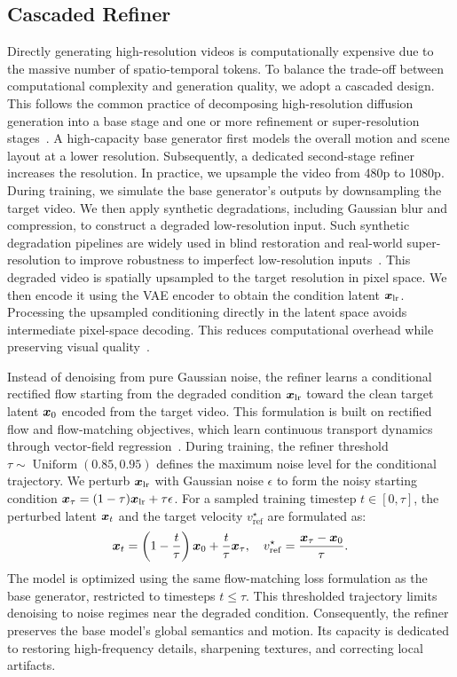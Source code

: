 \subsection{Cascaded Refiner}
Directly generating high-resolution videos is computationally expensive due to the massive number of spatio-temporal tokens.
To balance the trade-off between computational complexity and generation quality, we adopt a cascaded design.
This follows the common practice of decomposing high-resolution diffusion generation into a base stage and one or more refinement or super-resolution stages~\cite{saharia2021sr3,ho2022imagen,blattmann2023stable}.
A high-capacity base generator first models the overall motion and scene layout at a lower resolution.
Subsequently, a dedicated second-stage refiner increases the resolution.
In practice, we upsample the video from 480p to 1080p.
During training, we simulate the base generator's outputs by downsampling the target video.
We then apply synthetic degradations, including Gaussian blur and compression, to construct a degraded low-resolution input.
Such synthetic degradation pipelines are widely used in blind restoration and real-world super-resolution to improve robustness to imperfect low-resolution inputs~\cite{zhang2021bsrgan,wang2021realesrgan}.
This degraded video is spatially upsampled to the target resolution in pixel space.
We then encode it using the VAE encoder to obtain the condition latent ${\bm x}_{\mathrm{lr}}$.
Processing the upsampled conditioning directly in the latent space avoids intermediate pixel-space decoding.
This reduces computational overhead while preserving visual quality~\cite{flashvideo,hunyuanvideo15,longcatvideo,waver}.

Instead of denoising from pure Gaussian noise, the refiner learns a conditional rectified flow starting from the degraded condition ${\bm x}_{\mathrm{lr}}$ toward the clean target latent ${\bm x}_0$ encoded from the target video.
This formulation is built on rectified flow and flow-matching objectives, which learn continuous transport dynamics through vector-field regression~\cite{liu2022rectifiedflow,lipman2022flow,tong2023conditionalflowmatching}.
During training, the refiner threshold $\tau \sim \operatorname{Uniform}(0.85, 0.95)$ defines the maximum noise level for the conditional trajectory.
We perturb ${\bm x}_{\mathrm{lr}}$ with Gaussian noise $\epsilon$ to form the noisy starting condition ${\bm x}_{\tau} = (1-\tau){\bm x}_{\mathrm{lr}} + \tau\epsilon$.
For a sampled training timestep $t \in [0, \tau]$, the perturbed latent ${\bm x}_t$ and the target velocity $v^{\star}_{\mathrm{ref}}$ are formulated as:
\begin{equation}
    {\bm x}_t = \left(1-\frac{t}{\tau}\right){\bm x}_0 + \frac{t}{\tau}{\bm x}_{\tau}, \quad v^{\star}_{\mathrm{ref}} = \frac{{\bm x}_{\tau}-{\bm x}_0}{\tau}.
\end{equation}
The model is optimized using the same flow-matching loss formulation as the base generator, restricted to timesteps $t \le \tau$.
This thresholded trajectory limits denoising to noise regimes near the degraded condition.
Consequently, the refiner preserves the base model's global semantics and motion.
Its capacity is dedicated to restoring high-frequency details, sharpening textures, and correcting local artifacts.


